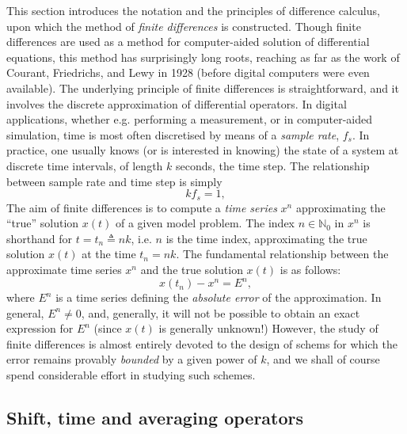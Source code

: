 \documentclass[11pt,twoside,a4paper,english]{book}
\begin{document}
This section introduces the notation and the principles of difference calculus, upon which the method of \emph{finite differences} is constructed. Though finite differences are used as a method for computer-aided solution of differential equations, this method has surprisingly long roots, reaching as far as the work of Courant, Friedrichs, and Lewy in 1928 (before digital computers were even available). The underlying principle of finite differences is straightforward, and it involves the discrete approximation of  differential operators. In digital applications, whether e.g. performing a measurement, or in computer-aided simulation, time is most often discretised by means of a \emph{sample rate}, $f_s$. In practice, one usually knows (or is interested in knowing) the state of a system at discrete time intervals, of length $k$ seconds, the time step. The relationship between sample rate and time step is simply
\begin{equation}
    k f_s = 1,
\end{equation}
The aim of finite differences is to compute a \emph{time series} $x^n$ approximating the ``true'' solution $x(t)$ of a given model problem. The index $n \in \mathbb{N}_0$ in $x^n$ is shorthand for $t = t_n \triangleq nk$, i.e. $n$ is the time index, approximating the true solution $x(t)$ at the time $t_n = nk$.  The fundamental relationship between the approximate time series $x^n$ and the true solution $x(t)$ is as follows:
\begin{equation}\label{eq:ErrDef}
    x(t_n) - x^n  = E^n ,
\end{equation}
where $E^n$ is a time series defining the \emph{absolute error} of the approximation. In general, $E^n \neq 0$, and, generally, it will not  be possible to obtain an exact expression for $E^n$ (since $x(t)$ is generally unknown!) However, the study of finite differences is almost entirely devoted to the design of schems for which the error remains provably \emph{bounded}  by a given power of $k$, and we shall of course spend considerable effort in studying such schemes.


\subsection{Shift, time and averaging operators}
\end{document}
